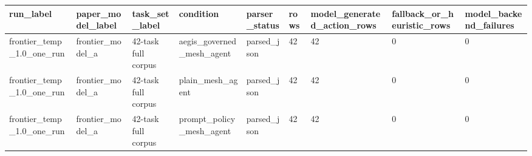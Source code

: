 \begin{tabular}{lllllllll}
 \hline
run\_label & paper\_model\_label & task\_set\_label & condition & parser\_status & rows & model\_generated\_action\_rows & fallback\_or\_heuristic\_rows & model\_backend\_failures \\
 \hline
frontier\_temp\_1.0\_one\_run & frontier\_model\_a & 42-task full corpus & aegis\_governed\_mesh\_agent & parsed\_json & 42 & 42 & 0 & 0 \\
frontier\_temp\_1.0\_one\_run & frontier\_model\_a & 42-task full corpus & plain\_mesh\_agent & parsed\_json & 42 & 42 & 0 & 0 \\
frontier\_temp\_1.0\_one\_run & frontier\_model\_a & 42-task full corpus & prompt\_policy\_mesh\_agent & parsed\_json & 42 & 42 & 0 & 0 \\
 \hline
\end{tabular}
